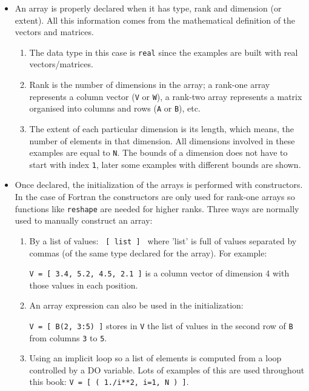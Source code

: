 \begin{itemize}
    \item An array is properly declared when it has type, rank and dimension (or extent). 
    All this information comes from the mathematical definition of the vectors and matrices.
    
    \begin{enumerate}
        \item The data type in this case is \texttt{real} since the examples are built with real vectors/matrices. 
        \item Rank is the number of dimensions in the array; a rank-one array represents a column vector (\texttt{V} or \texttt{W}), a rank-two array represents a matrix organised into columns and rows (\texttt{A} or \texttt{B}), etc. 
        \item The extent of each particular dimension is its length, which means, the number of elements in that dimension. All dimensions involved in these examples are equal to \texttt{N}. The bounds of a dimension does not have to start with index \texttt{1}, later some examples with different bounds are shown. 
    \end{enumerate}

    \item Once declared, the initialization of the arrays is performed with constructors. In the case of Fortran the constructors are only used for rank-one arrays so functions like \texttt{reshape} are needed for higher ranks. Three ways are normally used to manually construct an array:
    
    \begin{enumerate}
        \item By a list of values: \texttt{ [ list ] } where 'list' is full of values separated by commas (of the same type declared for the array). 
        For example: 
        
        \texttt{V = [ 3.4, 5.2, 4.5, 2.1 ]} is a column vector of dimension 4 with those values in each position.
        \item An array expression can also be used in the initialization: 
        
        \texttt{V = [ B(2, 3:5) ]} stores in \texttt{V} the list of values in the second row of \texttt{B} from columns \texttt{3} to \texttt{5}.
        \item Using an implicit loop so a list of elements is computed from a loop controlled by a DO variable. Lots of examples of this are used throughout this book: \texttt{V = [ ( 1./i**2, i=1, N ) ]}.
    \end{enumerate}


\end{itemize}

